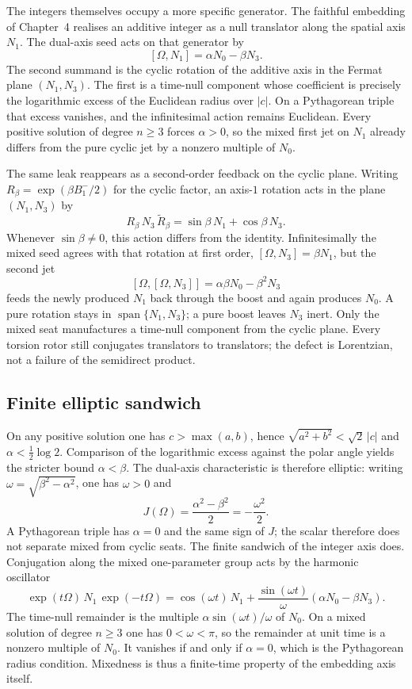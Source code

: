 \documentclass[a4paper]{article}
\theoremstyle{definition}
\theoremstyle{remark}
\begin{document}
The integers themselves occupy a more specific generator. The faithful embedding of Chapter~4 realises an additive integer as a null translator along the spatial axis \(N_1\). The dual-axis seed acts on that generator by
\[
[\Omega,N_1]=\alpha N_0-\beta N_3.
\]
The second summand is the cyclic rotation of the additive axis in the Fermat plane \((N_1,N_3)\). The first is a time-null component whose coefficient is precisely the logarithmic excess of the Euclidean radius over \(|c|\). On a Pythagorean triple that excess vanishes, and the infinitesimal action remains Euclidean. Every positive solution of degree \(n\ge 3\) forces \(\alpha>0\), so the mixed first jet on \(N_1\) already differs from the pure cyclic jet by a nonzero multiple of \(N_0\).

The same leak reappears as a second-order feedback on the cyclic plane. Writing \(R_\beta=\exp(\beta B^-_1/2)\) for the cyclic factor, an axis-\(1\) rotation acts in the plane \((N_1,N_3)\) by
\[
R_\beta\,N_3\,\widetilde{R}_\beta=\sin\beta\,N_1+\cos\beta\,N_3.
\]
Whenever \(\sin\beta\neq 0\), this action differs from the identity. Infinitesimally the mixed seed agrees with that rotation at first order, \([\Omega,N_3]=\beta N_1\), but the second jet
\[
[\Omega,[\Omega,N_3]]=\alpha\beta N_0-\beta^2 N_3
\]
feeds the newly produced \(N_1\) back through the boost and again produces \(N_0\). A pure rotation stays in \(\operatorname{span}\{N_1,N_3\}\); a pure boost leaves \(N_3\) inert. Only the mixed seat manufactures a time-null component from the cyclic plane. Every torsion rotor still conjugates translators to translators; the defect is Lorentzian, not a failure of the semidirect product.

\subsection{Finite elliptic sandwich}

On any positive solution one has \(c>\max(a,b)\), hence \(\sqrt{a^2+b^2}<\sqrt{2}\,|c|\) and \(\alpha<\frac12\log 2\). Comparison of the logarithmic excess against the polar angle yields the stricter bound \(\alpha<\beta\). The dual-axis characteristic is therefore elliptic: writing \(\omega=\sqrt{\beta^2-\alpha^2}\), one has \(\omega>0\) and
\[
J(\Omega)=\frac{\alpha^2-\beta^2}{2}=-\frac{\omega^2}{2}.
\]
A Pythagorean triple has \(\alpha=0\) and the same sign of \(J\); the scalar therefore does not separate mixed from cyclic seats. The finite sandwich of the integer axis does. Conjugation along the mixed one-parameter group acts by the harmonic oscillator
\[
\exp(t\Omega)\,N_1\,\exp(-t\Omega)=\cos(\omega t)\,N_1+\frac{\sin(\omega t)}{\omega}(\alpha N_0-\beta N_3).
\]
The time-null remainder is the multiple \(\alpha\sin(\omega t)/\omega\) of \(N_0\). On a mixed solution of degree \(n\ge 3\) one has \(0<\omega<\pi\), so the remainder at unit time is a nonzero multiple of \(N_0\). It vanishes if and only if \(\alpha=0\), which is the Pythagorean radius condition. Mixedness is thus a finite-time property of the embedding axis itself.
\end{document}
